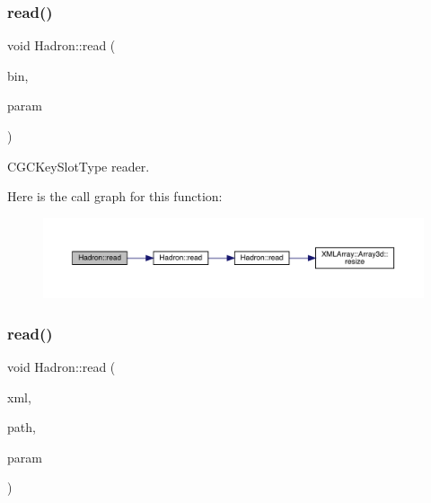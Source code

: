 \subsubsection{\texorpdfstring{read()}{read()}\hspace{0.1cm}{\footnotesize\ttfamily [3/94]}}
{\footnotesize\ttfamily void Hadron\+::read (\begin{DoxyParamCaption}\item[{\mbox{\hyperlink{classADATIO_1_1BinaryReader}{Binary\+Reader}} \&}]{bin,  }\item[{\mbox{\hyperlink{structHadron_1_1KeyCGCSU2__t}{Key\+C\+G\+C\+S\+U2\+\_\+t}} \&}]{param }\end{DoxyParamCaption})}



C\+G\+C\+Key\+Slot\+Type reader. 

Here is the call graph for this function\+:
\nopagebreak
\begin{figure}[H]
\begin{center}
\leavevmode
\includegraphics[width=350pt]{d1/daf/namespaceHadron_a5f60c1536ae1aac0334573f8a80eb687_cgraph}
\end{center}
\end{figure}
\mbox{\label{namespaceHadron_a32f04cfa14604e9b40e037d78c0fad86}} 
\subsubsection{\texorpdfstring{read()}{read()}\hspace{0.1cm}{\footnotesize\ttfamily [4/94]}}
{\footnotesize\ttfamily void Hadron\+::read (\begin{DoxyParamCaption}\item[{\mbox{\hyperlink{classADATXML_1_1XMLReader}{X\+M\+L\+Reader}} \&}]{xml,  }\item[{const std\+::string \&}]{path,  }\item[{\mbox{\hyperlink{structHadron_1_1KeyCGCSU3__t}{Key\+C\+G\+C\+S\+U3\+\_\+t}} \&}]{param }\end{DoxyParamCaption})}



